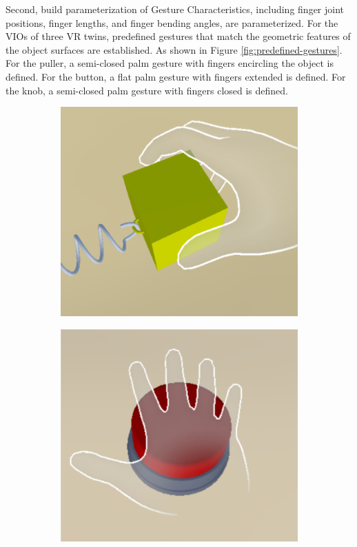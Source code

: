 \documentclass[sigconf,review,anonymous]{acmart}
\begin{document}
Second, build parameterization of Gesture Characteristics, including finger joint positions, finger lengths, and finger bending angles, are parameterized. For the VIOs of three VR twins, predefined gestures that match the geometric features of the object surfaces are established. As shown in Figure \ref{fig:predefined-gestures}. For the puller, a semi-closed palm gesture with fingers encircling the object is defined. For the button, a flat palm gesture with fingers extended is defined. For the knob, a semi-closed palm gesture with fingers closed is defined.

\begin{figure}[h]
  \begin{subfigure}{0.31\linewidth} %
    \centering
    \includegraphics[width=\linewidth]{image/predefined-gesture-puller.pdf}
    \caption{} %
    \label{fig:predefined-gestures-a}
  \end{subfigure}
  \hfill %
  \begin{subfigure}{0.31\linewidth} %
    \centering
    \includegraphics[width=\linewidth]{image/predefined-gesture-button.pdf}

\end{subfigure}
\end{figure}
\end{document}
